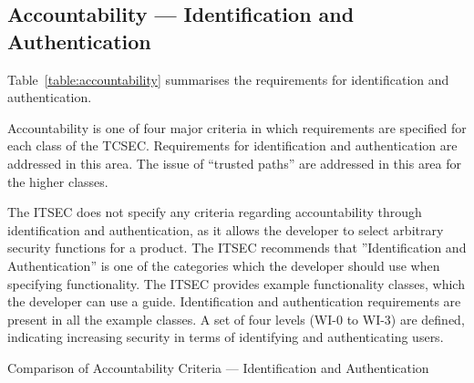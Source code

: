     \subsection{Accountability --- Identification and Authentication} 
    Table~\ref{table:accountability} summarises the requirements for identification and
    authentication.

    Accountability is one of four major criteria in which requirements 
    are specified for each class of the TCSEC.  
    Requirements for identification and authentication are addressed in this area. The issue of ``trusted paths'' 
    are addressed in this area for the higher classes.

    The ITSEC does not specify any criteria regarding accountability through identification and 
    authentication, as it allows
    the developer to select arbitrary security functions for a product.  
    The ITSEC recommends that ''Identification and Authentication'' is one of the categories which the developer should
    use when specifying functionality.  The ITSEC provides example functionality classes, which the 
    developer can use a guide. Identification and authentication requirements are present in all the example classes.
    A set of four levels (WI-0 to WI-3) are defined, indicating increasing security in
    terms of identifying and authenticating users.

    \begin{table}[H]
    \begin{center}
    \bc 
    \ec
    \end{center}
    \caption{Comparison of Accountability Criteria --- Identification and Authentication} \label{table:accountability}
    \end{table}


